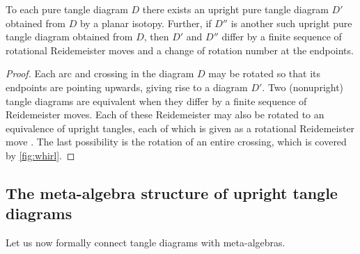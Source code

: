 \begin{lemma}
        To each pure tangle diagram $D$ there exists an upright pure tangle
        diagram $D'$ obtained from $D$ by a planar isotopy. Further, if $D''$ is
        another such upright pure tangle diagram obtained from $D$, then $D'$
        and $D''$ differ by a finite sequence of rotational Reidemeister moves
        and a change of rotation number at the endpoints.
\end{lemma}
\begin{proof}
        Each arc and crossing in the diagram $D$ may be rotated so that its
        endpoints are pointing upwards, giving rise to a diagram $D'$. Two
        (nonupright) tangle diagrams are equivalent when they differ by a finite
        sequence of Reidemeister moves. Each of these Reidemeister may also be
        rotated to an equivalence of upright tangles, each of which is given as
        a rotational Reidemeister move . The
        last possibility is the rotation of an entire crossing, which is covered
        by \cref{fig:whirl}.
\end{proof}

\subsection{The meta-algebra structure of upright tangle diagrams}

Let us now formally connect tangle diagrams with meta-algebras.

